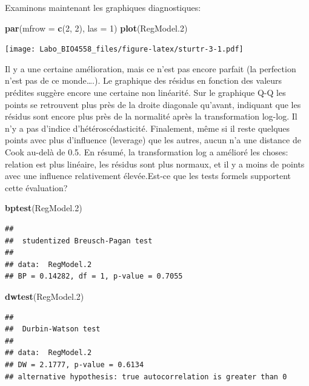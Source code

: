 \documentclass[
  12pt,
]{book}
\newenvironment{Shaded}{\begin{snugshade}}{\end{snugshade}}
\newcommand{\DataTypeTok}[1]{\textcolor[rgb]{0.13,0.29,0.53}{#1}}
\newcommand{\DecValTok}[1]{\textcolor[rgb]{0.00,0.00,0.81}{#1}}
\newcommand{\FloatTok}[1]{\textcolor[rgb]{0.00,0.00,0.81}{#1}}
\newcommand{\KeywordTok}[1]{\textcolor[rgb]{0.13,0.29,0.53}{\textbf{#1}}}
\newcommand{\NormalTok}[1]{#1}
\begin{document}
Examinons maintenant les graphiques diagnostiques:

\begin{Shaded}
\begin{Highlighting}[]
\KeywordTok{par}\NormalTok{(}\DataTypeTok{mfrow =} \KeywordTok{c}\NormalTok{(}\DecValTok{2}\NormalTok{, }\DecValTok{2}\NormalTok{), }\DataTypeTok{las =} \DecValTok{1}\NormalTok{)}
\KeywordTok{plot}\NormalTok{(RegModel}\FloatTok{.2}\NormalTok{)}
\end{Highlighting}
\end{Shaded}

\texttt{[image: Labo\_BIO4558\_files/figure-latex/sturtr-3-1.pdf]}

Il y a une certaine amélioration, mais ce n'est pas encore parfait (la perfection n'est pas de ce monde\ldots.). Le graphique des résidus en fonction des valeurs prédites suggère encore une certaine non linéarité. Sur le graphique Q-Q les points se retrouvent plus près de la droite diagonale qu'avant, indiquant que les résidus sont encore plus près de la normalité après la transformation log-log. Il n'y a pas d'indice d'hétéroscédasticité. Finalement, même si il reste quelques points avec plus d'influence (leverage) que les autres, aucun n'a une distance de Cook au-delà de 0.5. En résumé, la transformation log a amélioré les choses: relation est plus linéaire, les résidus sont plus normaux, et il y a moins de points avec une influence relativement élevée.Est-ce que les tests formels supportent cette évaluation?

\begin{Shaded}
\begin{Highlighting}[]
\KeywordTok{bptest}\NormalTok{(RegModel}\FloatTok{.2}\NormalTok{)}
\end{Highlighting}
\end{Shaded}

\begin{verbatim}
## 
##  studentized Breusch-Pagan test
## 
## data:  RegModel.2
## BP = 0.14282, df = 1, p-value = 0.7055
\end{verbatim}

\begin{Shaded}
\begin{Highlighting}[]
\KeywordTok{dwtest}\NormalTok{(RegModel}\FloatTok{.2}\NormalTok{)}
\end{Highlighting}
\end{Shaded}

\begin{verbatim}
## 
##  Durbin-Watson test
## 
## data:  RegModel.2
## DW = 2.1777, p-value = 0.6134
## alternative hypothesis: true autocorrelation is greater than 0
\end{verbatim}
\end{document}
